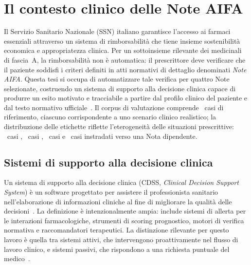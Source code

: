 
\chapter{Il contesto clinico delle Note AIFA}
\label{ch:contesto}

Il Servizio Sanitario Nazionale (SSN) italiano garantisce l'accesso ai farmaci essenziali
attraverso un sistema di rimborsabilità che tiene insieme sostenibilità economica e
appropriatezza clinica.
Per un sottoinsieme rilevante dei medicinali di fascia~A, la rimborsabilità non è
automatica: il prescrittore deve verificare che il paziente soddisfi i criteri
definiti in atti normativi di dettaglio denominati \emph{Note AIFA}.
Questa tesi si occupa di automatizzare tale verifica per quattro Note selezionate,
costruendo un sistema di supporto alla decisione clinica capace di produrre un
esito motivato e tracciabile a partire dal profilo clinico del paziente e dal testo
normativo ufficiale~\cite{aifa2024note}.
Il corpus di valutazione comprende \goldn\ casi di riferimento, ciascuno
corrispondente a uno scenario clinico realistico; la distribuzione delle etichette riflette l'eterogeneità
delle situazioni prescrittive: \goldRimb\ casi ,
\goldNonRimb\ casi , \goldNonDet\ casi
 e \goldRouted\ casi instradati verso una Nota
dipendente.

\section{Sistemi di supporto alla decisione clinica}
\label{sec:cdss-overview}

Un sistema di supporto alla decisione clinica (CDSS, \emph{Clinical Decision
Support System}) è un software progettato per assistere il professionista sanitario
nell'elaborazione di informazioni cliniche al fine di migliorare la qualità
delle decisioni~\cite{greenes2007cdss}.
La definizione è intenzionalmente ampia: include sistemi di allerta per le
interazioni farmacologiche, strumenti di scoring prognostico, motori di verifica
normativa e raccomandatori terapeutici.
La distinzione rilevante per questo lavoro è quella tra sistemi attivi, che
intervengono proattivamente nel flusso di lavoro clinico, e sistemi passivi, che
rispondono a una richiesta puntuale del medico~\cite{berner2007cdss}.

